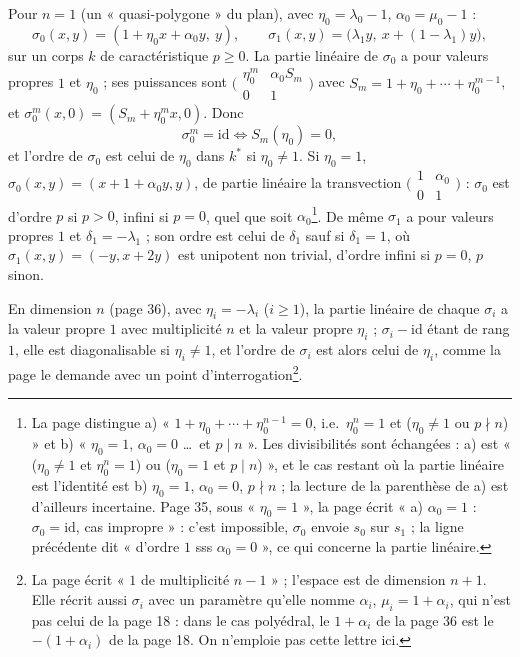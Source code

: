 \documentclass[11pt,a4paper]{article}
\begin{document}
Pour $n = 1$ (un « quasi-polygone » du plan), avec $\eta_0 = \lambda_0 - 1$,
$\alpha_0 = \mu_0 - 1$ :
\[
\sigma_0(x, y) = (1 + \eta_0 x + \alpha_0 y,\ y), \qquad \sigma_1(x, y) =
\bigl(\lambda_1 y,\ x + (1 - \lambda_1)y\bigr),
\]
sur un corps $k$ de caractéristique $p \geq 0$. La partie linéaire de
$\sigma_0$ a pour valeurs propres $1$ et $\eta_0$ ; ses puissances sont
$\bigl(\begin{smallmatrix} \eta_0^m & \alpha_0 S_m \\ 0 & 1 \end{smallmatrix}\bigr)$
avec $S_m = 1 + \eta_0 + \cdots + \eta_0^{m-1}$, et $\sigma_0^m(x, 0) = (S_m +
\eta_0^m x, 0)$. Donc
\[
\sigma_0^m = \mathrm{id} \iff S_m(\eta_0) = 0 ,
\]
et l'ordre de $\sigma_0$ est celui de $\eta_0$ dans $k^*$ si $\eta_0 \neq 1$. Si
$\eta_0 = 1$, $\sigma_0(x, y) = (x + 1 + \alpha_0 y, y)$, de partie linéaire la
transvection $\bigl(\begin{smallmatrix} 1 & \alpha_0 \\ 0 & 1
\end{smallmatrix}\bigr)$ : $\sigma_0$ est d'ordre $p$ si $p > 0$, infini si $p =
0$, quel que soit $\alpha_0$\footnote{La page distingue a) « $1 + \eta_0 +
\cdots + \eta_0^{n-1} = 0$, i.e.\ $\eta_0^n = 1$ et ($\eta_0 \neq 1$ ou $p \nmid
n$) » et b) « $\eta_0 = 1$, $\alpha_0 = 0$ \ldots\ et $p \mid n$ ». Les
divisibilités sont échangées : a) est « ($\eta_0 \neq 1$ et $\eta_0^n = 1$) ou
($\eta_0 = 1$ et $p \mid n$) », et le cas restant où la partie linéaire est
l'identité est b) $\eta_0 = 1$, $\alpha_0 = 0$, $p \nmid n$ ; la lecture de la
parenthèse de a) est d'ailleurs incertaine. Page 35, sous « $\eta_0 = 1$ », la
page écrit « a) $\alpha_0 = 1$ : $\sigma_0 = \mathrm{id}$, cas impropre » : c'est
impossible, $\sigma_0$ envoie $s_0$ sur $s_1$ ; la ligne précédente dit
« d'ordre $1$ sss $\alpha_0 = 0$ », ce qui concerne la partie linéaire.}.
De même $\sigma_1$ a pour valeurs propres $1$ et $\delta_1 = -\lambda_1$ ; son
ordre est celui de $\delta_1$ sauf si $\delta_1 = 1$, où $\sigma_1(x, y) = (-y, x
+ 2y)$ est unipotent non trivial, d'ordre infini si $p = 0$, $p$ sinon.

En dimension $n$ (page 36), avec $\eta_i = -\lambda_i$ ($i \geq 1$), la partie
linéaire de chaque $\sigma_i$ a la valeur propre $1$ avec multiplicité $n$ et
la valeur propre $\eta_i$ ; $\sigma_i - \mathrm{id}$ étant de rang $1$, elle est
diagonalisable si $\eta_i \neq 1$, et l'ordre de $\sigma_i$ est alors celui de
$\eta_i$, comme la page le demande avec un point
d'interrogation\footnote{La page écrit « $1$ de multiplicité $n - 1$ » ;
l'espace est de dimension $n + 1$. Elle récrit aussi $\sigma_i$ avec un
paramètre qu'elle nomme $\alpha_i$, $\mu_i = 1 + \alpha_i$, qui n'est pas celui
de la page 18 : dans le cas polyédral, le $1 + \alpha_i$ de la page 36 est le
$-(1 + \alpha_i)$ de la page 18. On n'emploie pas cette lettre ici.}.
\end{document}
